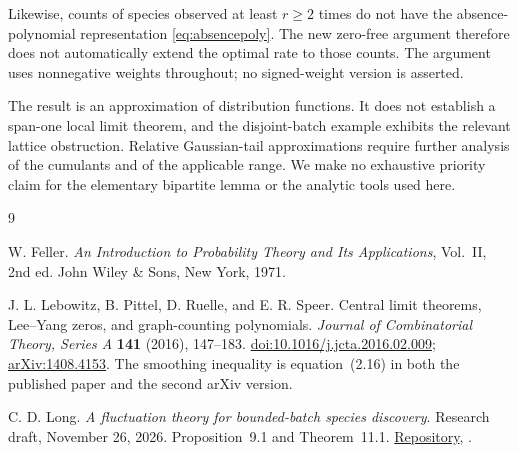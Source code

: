 \documentclass[11pt]{article}
\numberwithin{equation}{section}
\theoremstyle{remark}
\begin{document}
Likewise, counts of species observed at least $r\ge2$ times do not have the
absence-polynomial representation \eqref{eq:absencepoly}. The new
zero-free argument therefore does not automatically extend the optimal rate
to those counts. The argument uses nonnegative weights throughout; no
signed-weight version is asserted.

The result is an approximation of distribution functions. It does not
establish a span-one local limit theorem, and the disjoint-batch example
exhibits the relevant lattice obstruction. Relative Gaussian-tail
approximations require further analysis of the cumulants and of the
applicable range. We make no exhaustive priority claim for the elementary
bipartite lemma or the analytic tools used here.

\begin{thebibliography}{9}

W. Feller.
\emph{An Introduction to Probability Theory and Its Applications},
Vol.~II, 2nd ed. John Wiley \& Sons, New York, 1971.

J. L. Lebowitz, B. Pittel, D. Ruelle, and E. R. Speer.
Central limit theorems, Lee--Yang zeros, and graph-counting polynomials.
\emph{Journal of Combinatorial Theory, Series A} \textbf{141} (2016),
147--183.
\href{https://doi.org/10.1016/j.jcta.2016.02.009}{doi:10.1016/j.jcta.2016.02.009};
\href{https://arxiv.org/abs/1408.4153}{arXiv:1408.4153}.
The smoothing inequality is equation~(2.16) in both the published paper and
the second arXiv version.

C. D. Long.
\emph{A fluctuation theory for bounded-batch species discovery}.
Research draft, November 26, 2026.
Proposition~9.1 and Theorem~11.1.
\href{https://github.com/long-mathematics/bounded-batch-discovery}{Repository},
.

\end{thebibliography}
\end{document}
